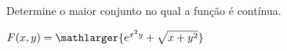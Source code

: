 
Determine o maior conjunto no qual a função é contínua.


$ F(x,y)=\mathlarger{e^{x^2y}+\sqrt{x+y^2}}$